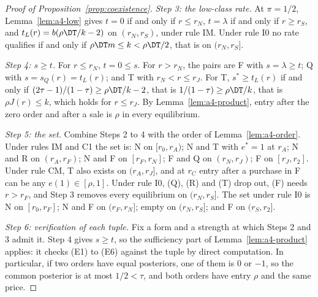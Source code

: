\begin{proof}[Proof of Proposition~\ref{prop:coexistence}]
\emph{Step 3: the low-class rate.} At \(\pi=1/2\), Lemma~\ref{lem:a4-low} gives \(t=0\) if and only if
\(r\le r_N\), \(t=\lambda\) if and only if \(r\ge r_S\), and \(t_L(r)=b(\rho\DT/k-2)\) on \((r_N,r_S)\), under
rule IM. Under rule I0 no rate qualifies if and only if \(\rho\DT m\le k<\rho\DT/2\), that is on \((r_N,r_S]\).

\emph{Step 4: \(s\ge t\).} For \(r\le r_N\), \(t=0\le s\). For \(r>r_N\), the pairs are F with \(s=\lambda\ge t\);
Q with \(s=s_Q(r)=t_L(r)\); and T with \(r_N<r\le r_J\). For T, \(s^*\ge t_L(r)\) if and only if
\((2\tau-1)/(1-\tau)\ge\rho\DT/k-2\), that is \(1/(1-\tau)\ge\rho\DT/k\), that is \(\rho J(r)\le k\), which holds
for \(r\le r_J\). By Lemma~\ref{lem:a4-product}, entry after the zero order and after a sale is \(\rho\) in every
equilibrium.

\emph{Step 5: the set.} Combine Steps 2 to 4 with the order of Lemma~\ref{lem:a4-order}. Under rules IM and C1 the
set is: N on \([r_0,r_A)\); N and T with \(e^*=1\) at \(r_A\); N and R on \((r_A,r_F)\); N and F on \([r_F,r_N]\);
F and Q on \((r_N,r_J)\); F on \([r_J,r_2]\). Under rule CM, T also exists on \((r_A,r_J]\), and at \(r_C\) entry
after a purchase in F can be any \(e(1)\in[\rho,1]\). Under rule I0, (Q), (R) and (T) drop out, (F) needs
\(r>r_F\), and Step 3 removes every equilibrium on \((r_N,r_S]\). The set under rule I0 is N on \([r_0,r_F]\); N
and F on \((r_F,r_N]\); empty on \((r_N,r_S]\); and F on \((r_S,r_2]\).

\emph{Step 6: verification of each tuple.} Fix a form and a strength at which Steps 2 and 3 admit it. Step 4 gives
\(s\ge t\), so the sufficiency part of Lemma~\ref{lem:a4-product} applies: it checks (E1) to (E6) against the
tuple by direct computation. In particular, if two orders have equal posteriors, one of them is \(0\) or \(-1\), so
the common posterior is at most \(1/2<\tau\), and both orders have entry \(\rho\) and the same price.


\end{proof}
